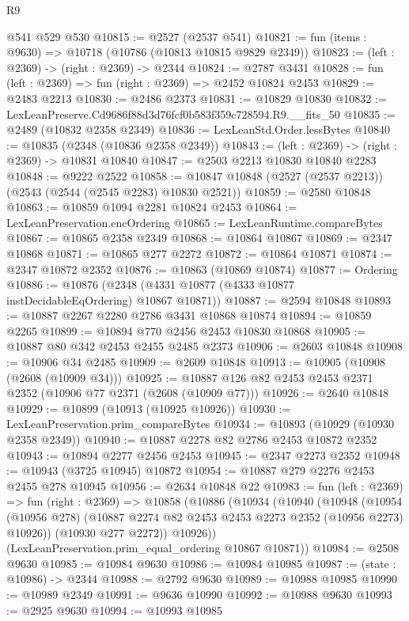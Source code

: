 \begin{lexlean}{R9}
\begin{coremodule}
    @541
    @529
    @530
@10815 := @2527 (@2537 @541)
@10821 := fun (items : @9630) => @10718 (@10786 (@10813 @10815 @9829 @2349))
@10823 := (left : @2369) -> (right : @2369) -> @2344
@10824 := @2787 @3431
@10828 := fun (left : @2369) => fun (right : @2369) => @2452 @10824 @2453
@10829 := @2483 @2213
@10830 := @2486 @2373
@10831 := @10829 @10830
@10832 := LexLeanPreserve.Cd9686f88d3d76fcf0b583f359c728594.R9.__fits_50
@10835 := @2489 (@10832 @2358 @2349)
@10836 := LexLeanStd.Order.lessBytes
@10840 := @10835 (@2348 (@10836 @2358 @2349))
@10843 := (left : @2369) -> (right : @2369) -> @10831 @10840
@10847 := @2503 @2213 @10830 @10840 @2283
@10848 := @9222 @2522
@10858 := @10847 @10848 (@2527 (@2537 @2213)) (@2543 (@2544 (@2545 @2283) @10830 @2521))
@10859 := @2580 @10848
@10863 := @10859 @1094 @2281 @10824 @2453
@10864 := LexLeanPreservation.encOrdering
@10865 := LexLeanRuntime.compareBytes
@10867 := @10865 @2358 @2349
@10868 := @10864 @10867
@10869 := @2347 @10868
@10871 := @10865 @277 @2272
@10872 := @10864 @10871
@10874 := @2347 @10872 @2352
@10876 := @10863 (@10869 @10874)
@10877 := Ordering
@10886 := @10876 (@2348 (@4331 @10877 (@4333 @10877 instDecidableEqOrdering) @10867 @10871))
@10887 := @2594 @10848
@10893 := @10887 @2267 @2280 @2786 @3431 @10868 @10874
@10894 := @10859 @2265
@10899 := @10894 @770 @2456 @2453 @10830 @10868
@10905 := @10887 @80 @342 @2453 @2455 @2485 @2373
@10906 := @2603 @10848
@10908 := @10906 @34 @2485
@10909 := @2609 @10848
@10913 := @10905 (@10908 (@2608 (@10909 @34)))
@10925 := @10887 @126 @82 @2453 @2453 @2371 @2352 (@10906 @77 @2371 (@2608 (@10909 @77)))
@10926 := @2640 @10848
@10929 := @10899 (@10913 (@10925 @10926))
@10930 := LexLeanPreservation.prim_compareBytes
@10934 := @10893 (@10929 (@10930 @2358 @2349))
@10940 := @10887 @2278 @82 @2786 @2453 @10872 @2352
@10943 := @10894 @2277 @2456 @2453
@10945 := @2347 @2273 @2352
@10948 := @10943 (@3725 @10945) @10872
@10954 := @10887 @279 @2276 @2453 @2455 @278 @10945
@10956 := @2634 @10848 @22
@10983 := fun (left : @2369) =>
  fun (right : @2369) =>
  @10858
    (@10886
      (@10934
        (@10940
          (@10948
            (@10954 (@10956 @278) (@10887 @2274 @82 @2453 @2453 @2273 @2352 (@10956 @2273) @10926))
            (@10930 @277 @2272))
          @10926))
      (LexLeanPreservation.prim_equal_ordering @10867 @10871))
@10984 := @2508 @9630
@10985 := @10984 @9630
@10986 := @10984 @10985
@10987 := (state : @10986) -> @2344
@10988 := @2792 @9630
@10989 := @10988 @10985
@10990 := @10989 @2349
@10991 := @9636 @10990
@10992 := @10988 @9630
@10993 := @2925 @9630
@10994 := @10993 @10985

\end{coremodule}
\end{lexlean}
